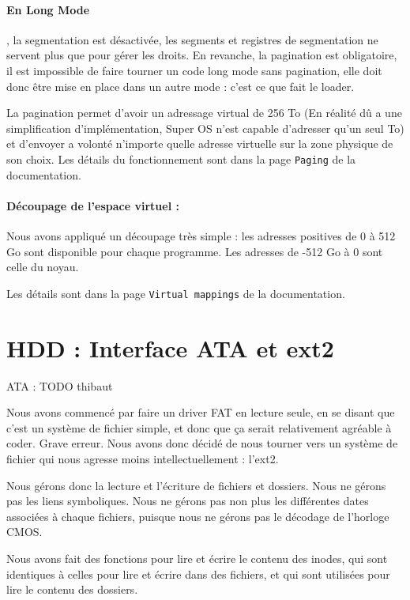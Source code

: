 \documentclass[12pt]{report}
\begin{document}
\paragraph{En Long Mode}, la segmentation est désactivée, les segments et registres de
segmentation ne servent plus que pour gérer les droits.
En revanche, la pagination est obligatoire, il est impossible de faire tourner
un code long mode sans pagination, elle doit donc être mise en place dans un
autre mode : c'est ce que fait le loader.

La pagination permet d'avoir un adressage virtual de 256 To (En réalité dû a une
simplification d'implémentation, Super OS n'est capable d'adresser qu'un seul
To) et d'envoyer a volonté n'importe quelle adresse virtuelle sur la zone
physique de son choix.
Les détails du fonctionnement sont dans la page \verb$Paging$ de la
documentation.

\paragraph{Découpage de l'espace virtuel :} Nous avons appliqué un découpage
très simple : les adresses positives de 0 à 512 Go sont disponible pour chaque
programme. Les adresses de -512 Go à 0 sont celle du noyau.

Les détails sont dans la page \verb$Virtual mappings$ de la documentation.

\section{HDD : Interface ATA et ext2}

ATA : TODO thibaut

Nous avons commencé par faire un driver FAT en lecture seule, en se disant que c'est un système de fichier simple, et donc que ça serait relativement agréable à coder.
Grave erreur.
Nous avons donc décidé de nous tourner vers un système de fichier qui nous agresse moins intellectuellement : l'ext2.

Nous gérons donc la lecture et l'écriture de fichiers et dossiers. Nous ne gérons pas les liens symboliques.
Nous ne gérons pas non plus les différentes dates associées à chaque fichiers, puisque nous ne gérons pas le décodage de l'horloge CMOS.

Nous avons fait des fonctions pour lire et écrire le contenu des inodes, qui sont identiques à celles pour lire et écrire dans des fichiers, et qui sont utilisées pour lire le contenu des dossiers.
\end{document}

